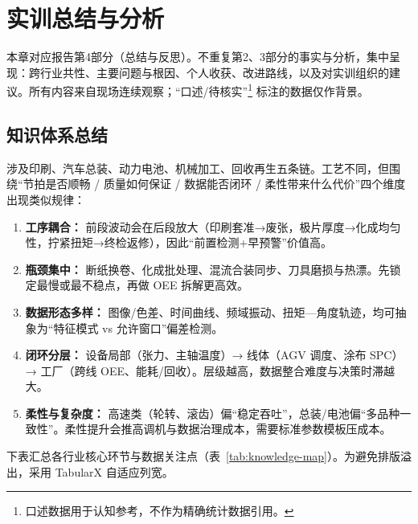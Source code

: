 \newpage
\section{实训总结与分析}

本章对应报告第4部分（总结与反思）。不重复第2、3部分的事实与分析，集中呈现：跨行业共性、主要问题与根因、个人收获、改进路线，以及对实训组织的建议。所有内容来自现场连续观察；“口述/待核实”\footnote{口述数据用于认知参考，不作为精确统计数据引用。} 标注的数据仅作背景。

\subsection{知识体系总结}
涉及印刷、汽车总装、动力电池、机械加工、回收再生五条链。工艺不同，但围绕“节拍是否顺畅 / 质量如何保证 / 数据能否闭环 / 柔性带来什么代价”四个维度出现类似规律：
\begin{enumerate}[label=\arabic*.]
\item \textbf{工序耦合：} 前段波动会在后段放大（印刷套准→废张，极片厚度→化成均匀性，拧紧扭矩→终检返修），因此“前置检测+早预警”价值高。
\item \textbf{瓶颈集中：} 断纸换卷、化成批处理、混流合装同步、刀具磨损与热漂。先锁定最慢或最不稳点，再做 OEE 拆解更高效。
\item \textbf{数据形态多样：} 图像/色差、时间曲线、频域振动、扭矩—角度轨迹，均可抽象为“特征模式 vs 允许窗口”偏差检测。
\item \textbf{闭环分层：} 设备局部（张力、主轴温度）→ 线体（AGV 调度、涂布 SPC）→ 工厂（跨线 OEE、能耗/回收）。层级越高，数据整合难度与决策时滞越大。
\item \textbf{柔性与复杂度：} 高速类（轮转、滚齿）偏“稳定吞吐”，总装/电池偏“多品种一致性”。柔性提升会推高调机与数据治理成本，需要标准参数模板压成本。
\end{enumerate}

下表汇总各行业核心环节与数据关注点（表~\ref{tab:knowledge-map}）。为避免排版溢出，采用 TabularX 自适应列宽。

